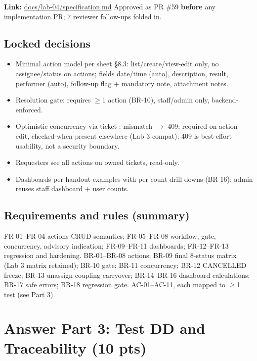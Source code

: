 \documentclass[11pt,a4paper]{article}
\begin{document}
\textbf{Link:} \href{https://github.com/thhanabun/Software\_Eng\_Lab/blob/main/docs/lab-04/specification.md}{docs/lab-04/specification.md}
Approved as PR \#59 \textbf{before} any implementation PR; 7 reviewer follow-ups folded in.

\subsection*{Locked decisions}
\begin{itemize}
\item Minimal action model per sheet \S8.3: list/create/view-edit only, no assignee/status on actions; fields date/time (auto), description, result, performer (auto), follow-up flag + mandatory note, attachment notes.
\item Resolution gate:  requires $\geq$1 action (BR-10), staff/admin only, backend-enforced.
\item Optimistic concurrency via ticket : mismatch $\to$ 409; required on action-edit, checked-when-present elsewhere (Lab 3 compat); 409 is best-effort usability, not a security boundary.
\item Requesters see all actions on owned tickets, read-only.
\item Dashboards per handout examples with per-count drill-downs (BR-16); admin reuses staff dashboard + user counts.
\end{itemize}

\subsection*{Requirements and rules (summary)}
FR-01--FR-04 actions CRUD semantics; FR-05--FR-08 workflow, gate, concurrency, advisory
indication; FR-09--FR-11 dashboards; FR-12--FR-13 regression and hardening.
BR-01--BR-08 actions; BR-09 final 8-status matrix (Lab 3 matrix retained); BR-10 gate;
BR-11 concurrency; BR-12 CANCELLED freeze; BR-13 unassign coupling carryover; BR-14--BR-16
dashboard calculations; BR-17 safe errors; BR-18 regression gate.
AC-01--AC-11, each mapped to $\geq$1 test (see Part 3).

\section*{Answer Part 3: Test DD and Traceability (10 pts)}
\end{document}

